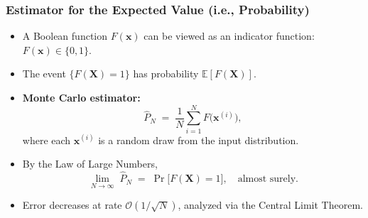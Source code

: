 \begin{frame}[t, allowframebreaks]
\frametitle{Estimator for the Expected Value (i.e., Probability)}
\begin{itemize}
  \item A Boolean function \(F(\mathbf{x})\) can be viewed as an indicator function: \(F(\mathbf{x}) \in \{0,1\}\).
  \item The event \(\{F(\mathbf{X})=1\}\) has probability \(\mathbb{E}[F(\mathbf{X})]\).
  \item \textbf{Monte Carlo estimator:}
    \[
      \widehat{P}_N
      \;=\;
      \frac{1}{N}\sum_{i=1}^N 
      F\!\bigl(\mathbf{x}^{(i)}\bigr),
    \]
    where each \(\mathbf{x}^{(i)}\) is a random draw from the input distribution.
  \item By the Law of Large Numbers,
    \[
      \lim_{N \to \infty}\;\widehat{P}_N
      \;=\;
      \Pr\bigl[F(\mathbf{X})=1\bigr],
      \quad \text{almost surely}.
    \]
  \item Error decreases at rate \(\mathcal{O}(1/\sqrt{N})\), analyzed via the Central Limit Theorem.
\end{itemize}
\end{frame}
